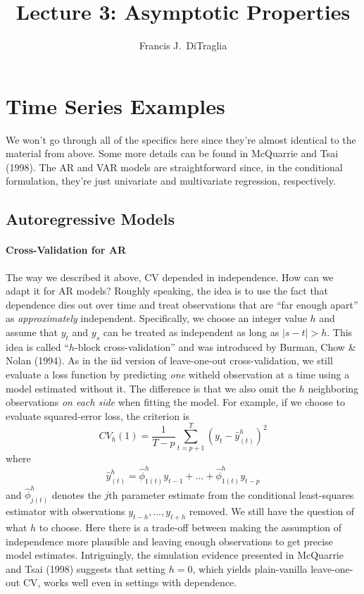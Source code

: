 \documentclass[12pt]{article}
\theoremstyle{definition}
\begin{document}
\title{Lecture 3: Asymptotic Properties}

\author{Francis J.\ DiTraglia}

\maketitle 



\section{Time Series Examples}
We won't go through all of the specifics here since they're almost identical to the material from above. Some more details can be found in
McQuarrie and Tsai (1998). The AR and VAR models are straightforward since, in the conditional formulation, they're just univariate and multivariate regression, respectively.

\subsection{Autoregressive Models}

\paragraph{Cross-Validation for AR}
The way we described it above, CV depended in independence. How can we adapt it for AR models? Roughly speaking, the idea is to use the fact that dependence dies out over time and treat observations that are ``far enough apart'' as \emph{approximately} independent. Specifically, we choose an integer value $h$ and assume that $y_t$ and $y_s$ can be treated as independent as long as $|s - t|>h$. This idea is called ``$h$-block cross-validation'' and was introduced by Burman, Chow \& Nolan (1994). As in the iid version of leave-one-out cross-validation, we still evaluate a loss function by predicting \emph{one} witheld observation at a time using a model estimated without it. The difference is that we also omit the $h$ neighboring observations \emph{on each side} when fitting the model. For example, if we choose to evaluate squared-error loss, the criterion is
	$$CV_h(1) = \frac{1}{T-p}\sum_{t = p+1}^T \left(y_t - \hat{y}_{(t)}^h\right)^2$$
where 
$$\hat{y}^h_{(t)} = \hat{\phi}^h_{1(t)} y_{t-1} + \hdots + \hat{\phi}^h_{1(t)}y_{t-p}$$
and $\hat{\phi}^h_{j(t)}$ denotes the $j$th parameter estimate from the conditional least-squares estimator with observations $y_{t-h}, \hdots,  y_{t+h}$ removed. We still have the question of what $h$ to choose. Here there is a trade-off between making the assumption of independence more plausible and leaving enough observations to get precise model estimates. Intriguingly, the simulation evidence presented in McQuarrie and Tsai (1998) suggests that setting $h=0$, which yields plain-vanilla leave-one-out CV, works well even in settings with dependence.
\end{document}
